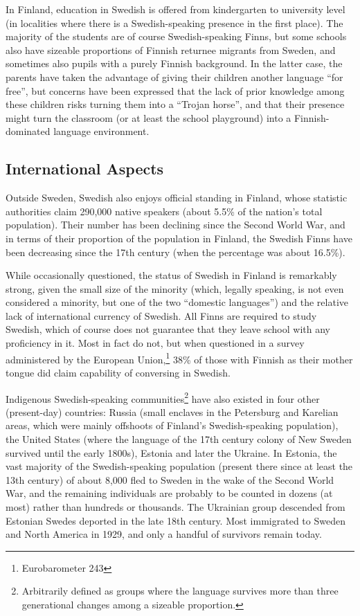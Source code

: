 \begin{multicols}{2}
In Finland, education in Swedish is offered from kindergarten to
university level (in localities where there is a Swedish-speaking
presence in the first place). The majority of the students are of
course Swedish-speaking Finns, but some schools also have sizeable
proportions of Finnish returnee migrants from Sweden, and sometimes
also pupils with a purely Finnish background. In the latter case, the
parents have taken the advantage of giving their children another
language ``for free'', but concerns have been expressed that the lack of
prior knowledge among these children risks turning them into a ``Trojan
horse'', and that their presence might turn the classroom (or at least
the school playground) into a Finnish-dominated language environment.

\subsection{International Aspects}

Outside Sweden, Swedish also enjoys official standing in Finland,
whose statistic authorities claim 290,000 native speakers (about 5.5\%
of the nation’s total population). Their number has been declining
since the Second World War, and in terms of their proportion of the
population in Finland, the Swedish Finns have been decreasing since
the 17th century (when the percentage was about 16.5\%).

While occasionally questioned, the status of Swedish in Finland is
remarkably strong, given the small size of the minority (which,
legally speaking, is not even considered a minority, but one of the
two ``domestic languages'') and the relative lack of international
currency of Swedish. All Finns are required to study Swedish, which of
course does not guarantee that they leave school with any proficiency
in it. Most in fact do not, but when questioned in a survey
administered by the European Union,\footnote{Eurobarometer 243} 38\%
of those with Finnish as their mother tongue did claim capability of
conversing in Swedish.


Indigenous Swedish-speaking communities\footnote{Arbitrarily defined
  as groups where the language survives more than three generational
  changes among a sizeable proportion.} have also existed in four
other (present-day) countries: Russia (small enclaves in the
Petersburg and Karelian areas, which were mainly offshoots of
Finland’s Swedish-speaking population), the United States (where the
language of the 17th century colony of New Sweden survived until the
early 1800s), Estonia and later the Ukraine. In Estonia, the vast
majority of the Swedish-speaking population (present there since at
least the 13th century) of about 8,000 fled to Sweden in the wake of
the Second World War, and the remaining individuals are probably to be
counted in dozens (at most) rather than hundreds or thousands. The
Ukrainian group descended from Estonian Swedes deported in the late
18th century. Most immigrated to Sweden and North America in 1929, and
only a handful of survivors remain today.


\end{multicols}
